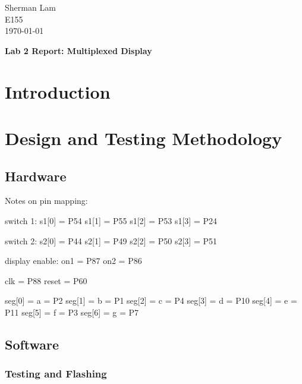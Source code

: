 \documentclass[11pt]{article}
\begin{document}
\begin{flushleft}
Sherman Lam
\\E155
\\ \today
\end{flushleft}


\begin{center}
\begin{Large}
\textbf{Lab 2 Report: Multiplexed Display}
\end{Large}
\end{center}




\section{Introduction}
\label{sec:intro}



\section{Design and Testing Methodology}

\subsection{Hardware}

Notes on pin mapping:

switch 1:
s1[0] = P54
s1[1] = P55
s1[2] = P53
s1[3] = P24

switch 2:
s2[0] = P44
s2[1] = P49
s2[2] = P50
s2[3] = P51

display enable:
on1 = P87
on2 = P86

clk = P88
reset = P60

seg[0] = a = P2
seg[1] = b = P1
seg[2] = c = P4
seg[3] = d = P10
seg[4] = e = P11
seg[5] = f = P3
seg[6] = g = P7


\subsection{Software}



\label{sec:software_LEDbar}

\subsubsection{Testing and Flashing}
\end{document}
